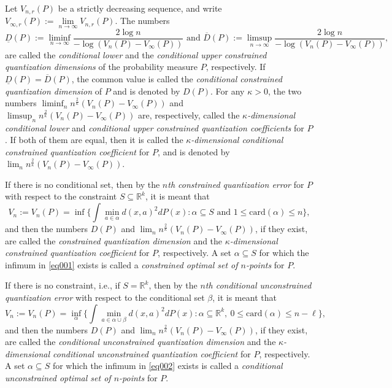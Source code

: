 \documentclass[12pt, reqno]{amsart}
\theoremstyle{plain}
\theoremstyle{definition}
\newcommand{\uu}{\cup}%
\newcommand{\ci}{\subseteq}%
\newcommand{\ga}{\alpha}
\newcommand{\gb}{\beta}
\newcommand{\gk}{\kappa}
\newcommand{\tit}{\textit}%
\newcommand{\D}[1]{\mathbb{#1}}%
\newcommand{\te}{\text}%
\newcommand{\ol}{\overline}
\begin{document}
 
 Let $V_{n, r}(P)$ be a strictly decreasing sequence, and write $V_{\infty, r}(P):=\mathop{\lim}\limits_{n\to \infty} V_{n, r}(P)$. The numbers
\begin{equation} \label{eq55} \underline D(P):=\liminf_{n\to \infty}  \frac{2\log n}{-\log (V_n(P)-V_\infty(P))} \te{ and } \ol D(P):=\limsup_{n\to \infty} \frac{2\log n}{-\log (V_n(P)-V_\infty(P))}, \end{equation}
are called the \tit{conditional lower} and the \tit{conditional upper constrained quantization dimensions} of the probability measure $P$, respectively. If $\underline D (P)=\ol D (P)$, the common value is called the \tit{conditional constrained quantization dimension} of $P$ and is denoted by $D(P)$. For any $\gk>0$, the two numbers $\liminf_n n^{\frac 2 \gk}  (V_n(P)-V_\infty(P))$ and $\limsup_n  n^{\frac 2 \gk}(V_n(P)-V_\infty(P))$ are, respectively, called the \tit{$\gk$-dimensional conditional lower} and \tit{conditional upper constrained quantization coefficients} for $P$. If both of them are equal, then it is called the \tit{$\gk$-dimensional conditional constrained quantization coefficient} for $P$, and is denoted by $\lim_n  n^{\frac 2 \gk}(V_n(P)-V_\infty(P))$.   
\par
 If there is no conditional set, then by the \tit{$n$th constrained quantization error} for $P$ with respect to the constraint $S\ci \D R^k$, it is meant that 
\begin{equation} \label{eq001}
V_{n}:=V_{n}(P)= \inf\Big\{\int \mathop{\min}\limits_{a\in\ga} d(x, a)^2 dP(x) :  \ga\ci S \te{ and } 1\leq \text{card}(\ga) \leq n\Big\},
\end{equation}
and then the numbers $D(P)$ and $\lim_n  n^{\frac 2 \gk}(V_n(P)-V_\infty(P))$, if they exist, are called the \tit{constrained quantization dimension} and the \tit{$\gk$-dimensional constrained quantization coefficient} for $P$, respectively. A set $\ga\ci S$ for which the infimum in \eqref{eq001} exists is called a \tit{constrained optimal set of $n$-points} for $P$. 
\par 
If there is no constraint, i.e., if $S=\D R^k$, then by the \tit{$n$th conditional unconstrained quantization error} with respect to the conditional set $\gb$, it is meant that 
\begin{equation} \label{eq002}
V_{n}:=V_{n}(P)=\inf_{\ga} \Big\{\int \mathop{\min}\limits_{a\in\ga\uu\gb} d(x, a)^2 dP(x) : \ga \ci \D R^k, ~ 0\leq  \text{card}(\ga) \leq n-\ell \Big\},
\end{equation}
and then the numbers $D(P)$ and $\lim_n  n^{\frac 2 \gk}(V_n(P)-V_\infty(P))$, if they exist, are called the \tit{conditional unconstrained quantization dimension} and the \tit{$\gk$-dimensional conditional unconstrained quantization coefficient} for $P$, respectively. A set $\ga\ci S$ for which the infimum in \eqref{eq002} exists is called a \tit{conditional unconstrained optimal set of $n$-points} for $P$.
\end{document}

